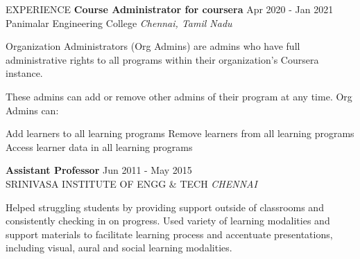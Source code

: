 \documentclass{resume}
\begin{document}
\begin{rSection}{EXPERIENCE}
\textbf{Course Administrator for coursera} \hfill Apr 2020 - Jan 2021\\
Panimalar Engineering College \hfill \textit{Chennai, Tamil Nadu}

Organization Administrators (Org Admins) are admins who have full administrative rights to all programs within their organization's Coursera instance.

These  admins can add or remove other admins of their program at any time. Org Admins can:

Add learners to all learning programs
Remove learners from all learning programs
Access learner data in all learning programs

\textbf{Assistant Professor} \hfill Jun 2011 - May 2015\\
SRINIVASA INSTITUTE OF ENGG & TECH \hfill \textit{CHENNAI}

Helped struggling students by providing support outside of classrooms and consistently checking in
on progress.
Used variety of learning modalities and support materials to facilitate learning process and
accentuate presentations, including visual, aural and social learning modalities.


\end{rSection}

\vspace{1.5em}

\end{document}
